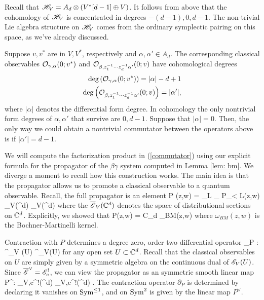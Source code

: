 Recall that $\mathscr H_V = A_d \otimes (V^*[d-1] \oplus V)$.
It follows from above that the cohomology of $\mathscr H_V$ is concentrated in degrees $-(d-1), 0, d-1$. 
The non-trivial Lie algebra structure on $\mathscr H_V$ comes from the ordinary symplectic pairing on this space, as we've already discussed. 

Suppose $v,v^*$ are in $V,V^*$, respectively and $\alpha,\alpha' \in A_d$.
The corresponding classical observables $\mathcal O_{\gamma,\alpha}(0;v^*)$ and $\mathcal O_{\beta, z_1^{-1}\cdots z_d^{-1} \alpha'}(0;v)$ have cohomological degrees
\begin{align*}
{\rm deg}\left(\mathcal O_{\gamma,\alpha}(0;v^*)\right) = |\alpha| - d + 1 \\
{\rm deg}\left(\mathcal O_{\beta, z_1^{-1}\cdots z_d^{-1} \alpha'}(0;v)\right) = |\alpha'|,
\end{align*}
where $|\alpha|$ denotes the differential form degree.
In cohomology the only nontrivial form degrees of $\alpha,\alpha'$ that survive are $0,d-1$. 
Suppose that $|\alpha| = 0$.
Then, the only way we could obtain a nontrivial commutator between the operators above is if $|\alpha'| = d-1$. 

We will compute the factorization product in (\ref{commutator}) using our explicit formula for the propagator of the $\beta\gamma$ system computed in Lemma \ref{lem: bm}.
We diverge a moment to recall how this construction works.
The main idea is that the propagator allows us to promote a classical observable to a quantum observable.
Recall, the full propagator is an element
\ben 
P (z,w) = \lim_{L\to \infty} \lim_{\epsilon {}} P_{\epsilon < L}(z,w) \in \Bar{\sE}_V(\CC^d) \Hat{\tensor} \Bar{\sE}_V(\CC^d)
\een
where the $\overline{\mathscr E}_V(\mathbb C^d)$ denotes the space of distributional sections on $\mathbb C^d$.
Explicitly, we showed that 
\ben
P(z,w) = C_d \;\omega_{BM}(z,w) 
\een
where $\omega_{BM}(z,w)$ is the Bochner-Martinelli kernel.

Contraction with $P$ determines a degree zero, order two differential operator
\ben
\partial_{P} : \Obs^{\cl}_V (U) \to \Obs^{\cl}_{V}(U)
\een
for any open set $U \subset \mathbb C^d$. 
Recall that the classical observables on $U$ are simply given by a symmetric algebra on the continuous dual of $\mathscr E_V(U)$. 
Since $\overline{\mathscr E}^\vee = \mathscr E_c^!$, we can view the propagator as an symmetric smooth linear map
\ben
P^\vee : \sE_{V,c}^!(\CC^d) \Hat{\tensor} \sE_{V,c}^!(\CC^d) \to \CC .
\een
The contraction operator $\partial_P$ is determined by declaring it vanishes on ${\rm Sym}^{\leq 1}$, and on ${\rm Sym}^2$ is given by the linear map $P^\vee$. 

